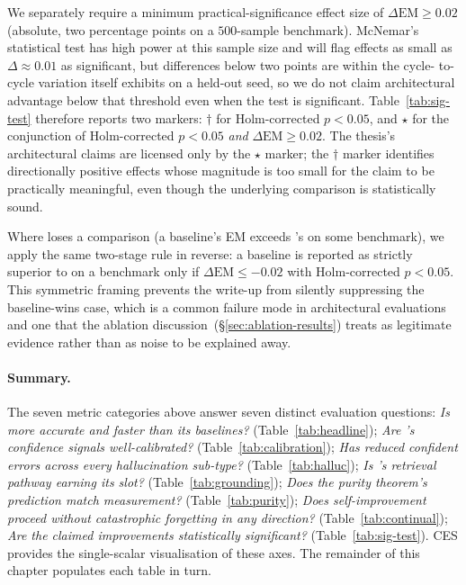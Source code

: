 We separately require a minimum practical-significance effect size of
$\Delta \mathrm{EM} \geq 0.02$ (absolute, two percentage points on a
$500$-sample benchmark). McNemar's statistical test has high power at
this sample size and will flag effects as small as $\Delta \approx 0.01$
as significant, but differences below two points are within the cycle-
to-cycle variation \caem{} itself exhibits on a held-out seed, so we
do not claim architectural advantage below that threshold even when
the test is significant. Table~\ref{tab:sig-test} therefore reports
two markers: $\dagger$ for Holm-corrected $p < 0.05$, and $\star$ for
the conjunction of Holm-corrected $p < 0.05$ \emph{and}
$\Delta \mathrm{EM} \geq 0.02$. The thesis's architectural claims are
licensed only by the $\star$ marker; the $\dagger$ marker identifies
directionally positive effects whose magnitude is too small for the
claim to be practically meaningful, even though the underlying
comparison is statistically sound.

Where \caem{} loses a comparison (a baseline's EM exceeds \caem{}'s on
some benchmark), we apply the same two-stage rule in reverse: a
baseline is reported as strictly superior to \caem{} on a benchmark
only if $\Delta \mathrm{EM} \leq -0.02$ with Holm-corrected
$p < 0.05$. This symmetric framing prevents the write-up from silently
suppressing the baseline-wins case, which is a common failure mode
in architectural evaluations and one that the ablation
discussion~(\S\ref{sec:ablation-results}) treats as legitimate
evidence rather than as noise to be explained away.

\paragraph{Summary.}
The seven metric categories above answer seven distinct evaluation
questions: \emph{Is \caem{} more accurate and faster than its
baselines?} (Table~\ref{tab:headline});
\emph{Are \caem{}'s confidence signals well-calibrated?}
(Table~\ref{tab:calibration});
\emph{Has \caem{} reduced confident errors across every hallucination
sub-type?} (Table~\ref{tab:halluc});
\emph{Is \caem{}'s retrieval pathway earning its slot?}
(Table~\ref{tab:grounding});
\emph{Does the purity theorem's prediction match measurement?}
(Table~\ref{tab:purity});
\emph{Does self-improvement proceed without catastrophic forgetting
in any direction?} (Table~\ref{tab:continual});
\emph{Are the claimed improvements statistically significant?}
(Table~\ref{tab:sig-test}).
CES provides the single-scalar visualisation of these axes.
The remainder of this chapter populates each table in turn.

